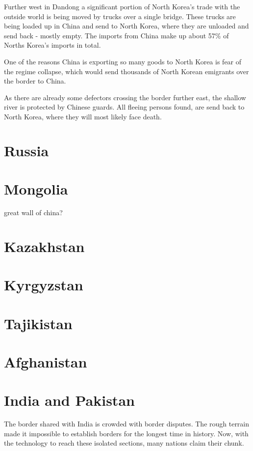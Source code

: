 \documentclass[conference]{IEEEtran}
\begin{document}
	Further west in Dandong a significant portion of North Korea's trade with the outside world is being moved by trucks over a single bridge. These trucks are being loaded up in China and send to North Korea, where they are unloaded and send back - mostly empty. The imports from China make up about 57\%\cite{wp_economyOfNorthKorea} of Norths Korea's imports in total.
	
	One of the reasons China is exporting so many goods to North Korea is fear of the regime collapse, which would send thousands of North Korean emigrants over the border to China.
	
	As there are already some defectors crossing the border further east, the shallow river is protected by Chinese guards.\cite{yp_anInconvenientBorderWhereChinaMeetsNorthKoreaABCNews} All fleeing persons found, are send back to North Korea, where they will most likely face death.
	
	\section{Russia}
	
	\section{Mongolia}
	
	great wall of china?
	
	\section{Kazakhstan}
	
	\section{Kyrgyzstan}
	
	\section{Tajikistan}
	
	\section{Afghanistan}
	
	\section{India and Pakistan}
	The border shared with India is crowded with border disputes. The rough terrain made it impossible to establish borders for the longest time in history. Now, with the technology to reach these isolated sections, many nations claim their chunk.
	
\end{document}

